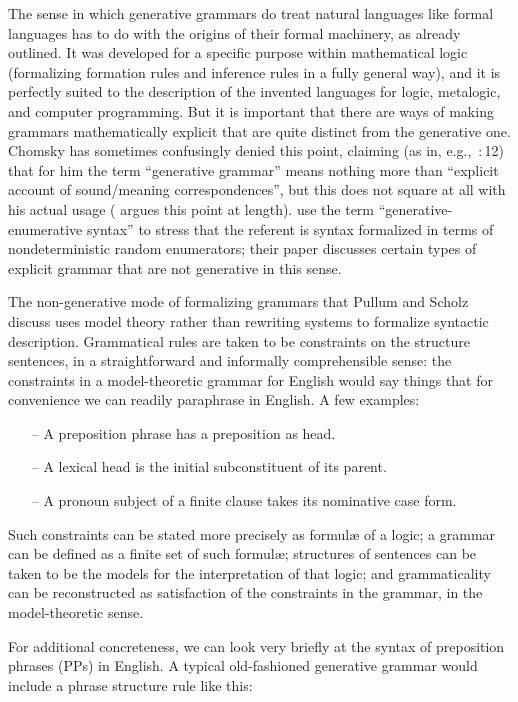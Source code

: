 \documentclass[output=paper]{langscibook}
\begin{document}
The sense in which generative grammars do treat natural languages like formal languages has to do with the origins of their formal machinery, as already outlined.  It was developed for a specific purpose within mathematical logic (formalizing formation rules and inference rules in a fully general way), and it is perfectly suited to the description of the invented languages for logic, metalogic, and computer programming.  But it is important that there are ways of making grammars mathematically explicit that are quite distinct from the generative one.  Chomsky has sometimes confusingly denied this point, claiming (as in, e.g.,\ \citealt{Chomsky66Topics}:\,12) that for him the term ``generative grammar'' means nothing more than ``explicit account of sound/meaning correspondences'', but this does not square at all with his actual usage (\citealt{Ney93} argues this point at length). \citet{PullScho01LACL} use the term ``generative-enumerative syntax'' to stress that the referent is syntax formalized in terms of nondeterministic random enumerators; their paper discusses certain types of explicit grammar that are not generative in this sense.

The non-generative mode of formalizing grammars that Pullum and Scholz discuss uses model theory rather than rewriting systems to formalize syntactic description. Grammatical rules are taken to be constraints on the structure sentences, in a straightforward and informally comprehensible sense: the constraints in a model-theoretic grammar for English would say things that for convenience we can readily paraphrase in English. A few examples:

\begin{itemize} 
\item[–] A preposition phrase has a preposition as head. 
\item[–] A lexical head is the initial subconstituent of its parent. 
\item[–] A pronoun subject of a finite clause takes its nominative case form. 
\end{itemize} 

Such constraints can be stated more precisely as formul{\ae} of a logic; a grammar can be defined as a finite set of such formul{\ae}; structures of sentences can be taken to be the models for the interpretation of that logic; and grammaticality can be reconstructed as satisfaction of the constraints in the grammar, in the model-theoretic sense.

For additional concreteness, we can look very briefly at the syntax of preposition phrases (PPs) in English.  A typical old-fashioned generative grammar would include a phrase structure rule like this:
\end{document}
